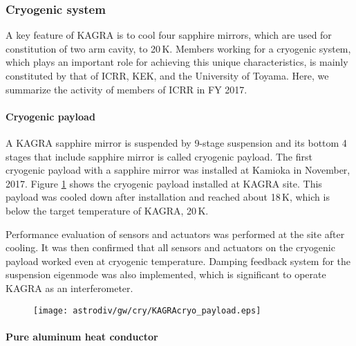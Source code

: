 \subsubsection*{\bf Cryogenic system}

\vspace{3pt}

A key feature of KAGRA is to cool four sapphire mirrors, which are used for constitution of two arm cavity, to 20\,K. Members working for a cryogenic system, which plays an important role for achieving this unique characteristics, is mainly constituted by that of ICRR, KEK, and the University of Toyama. Here, we summarize the activity of members of ICRR in FY 2017.

\paragraph*{\bi Cryogenic payload}

A KAGRA sapphire mirror is suspended by 9-stage suspension and its bottom 4 stages that include sapphire mirror is called cryogenic payload. The first cryogenic payload with a sapphire mirror was installed at Kamioka in November, 2017. Figure \ref{fig:KAGRAcryo payload} shows the cryogenic payload installed at KAGRA site. This payload was cooled down after installation and reached about 18\,K, which is below the target temperature of KAGRA, 20\,K.

Performance evaluation of sensors and actuators was performed at the site after cooling. It was then confirmed that all sensors and actuators on the cryogenic payload worked even at cryogenic temperature. Damping feedback system for the suspension eigenmode was also implemented, which is significant to operate KAGRA as an interferometer.

\begin{figure}[hbtp]
\begin{center}
\texttt{[image: astrodiv/gw/cry/KAGRAcryo\_payload.eps]}
\caption{\utsm {}}
\label{fig:KAGRAcryo payload}
\end{center}
\end{figure}

\paragraph*{\bi Pure aluminum heat conductor}

